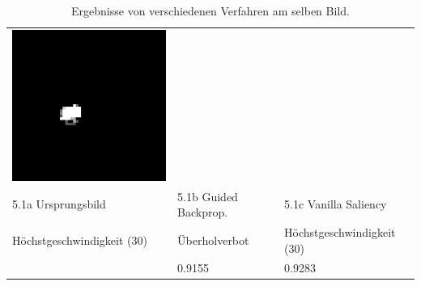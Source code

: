 \begin{table}
\begin{tabular}{p{4.4cm}p{4.4cm}p{4.4cm}}
		\includegraphics[width=\linewidth]{Images/AnPe/10771_vanil}\\ 
		\label{fig:salUrsprung} 5.1a Ursprungsbild &5.1b Guided Backprop. &5.1c Vanilla Saliency \\
		Höchstgeschwindigkeit (30) & Überholverbot & Höchstgeschwindigkeit (30)\\
		& 0.9155 & 0.9283\\
		
	\end{tabular} 

	\caption{Ergebnisse von verschiedenen Verfahren am selben Bild. }
	\label{tab:sal1}
\end{table}


